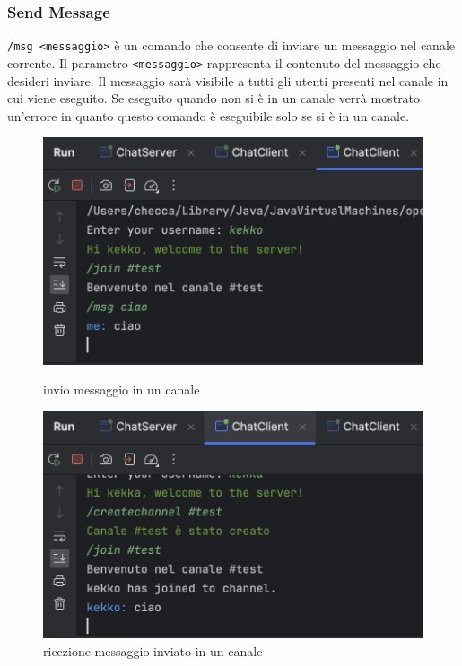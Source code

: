 \subsubsection{Send Message}
\texttt{/msg <messaggio>} è un comando che consente di inviare un messaggio nel canale corrente. Il parametro \texttt{<messaggio>} rappresenta il contenuto del messaggio che desideri inviare. Il messaggio sarà visibile a tutti gli utenti presenti nel canale in cui viene eseguito. Se eseguito quando non si è in un canale verrà mostrato un'errore in quanto questo comando è eseguibile solo se si è in un canale.
\begin{figure}[h]
  \centering
  \begin{minipage}{0.45\textwidth}
    \includegraphics[width=\linewidth]{imagens/outputs/6.png}
    \caption{invio messaggio in un canale}
  \end{minipage}\hfill
  \begin{minipage}{0.45\textwidth}
    \includegraphics[width=\linewidth]{imagens/outputs/6_2.png}
    \caption{ricezione messaggio inviato in un canale}
  \end{minipage}\hfill
\end{figure}
\newpage

